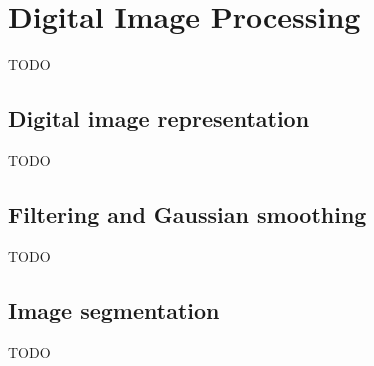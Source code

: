 \section{Digital Image Processing}
TODO
\subsection{Digital image representation}
TODO
\subsection{Filtering and Gaussian smoothing}
TODO
\subsection{Image segmentation}
TODO
